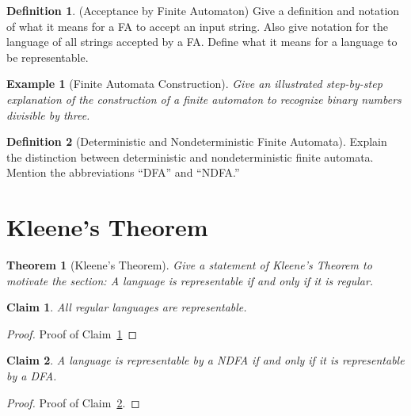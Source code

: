 \documentclass[12 pt, twoside, letterpaper]{article}
\newcommand{\refprop}[1]{Claim~\ref{#1}}
\theoremstyle{definition}
\newtheorem{definition}{Definition}
\theoremstyle{remark}
\theoremstyle{plain}
\newtheorem*{example}{Example}
\newtheorem{theorem}{Theorem}
\newtheorem{claim}{Claim}
\begin{document}
	\begin{definition}(Acceptance by Finite Automaton)
		Give a definition and notation of what it means for a FA to accept an input string.
		Also give notation for the language of all strings accepted by a FA.
		Define what it means for a language to be representable.
	\end{definition}

	\begin{example}[Finite Automata Construction]
		Give an illustrated step-by-step explanation of the construction of a finite automaton to recognize binary numbers divisible by three.
	\end{example}

	\begin{definition}[Deterministic and Nondeterministic Finite Automata]
		Explain the distinction between deterministic and nondeterministic finite automata.
		Mention the abbreviations ``DFA'' and ``NDFA.''
	\end{definition}


\section{Kleene's Theorem} %
\label{sec:kleenes_theorem}

	\begin{theorem}[Kleene's Theorem]
		Give a statement of Kleene's Theorem to motivate the section:
		A language is representable if and only if it is regular.
	\end{theorem}

	\begin{claim}
	\label{prop:regular_languages_representable}
		All regular languages are representable.
	\end{claim}

	\begin{proof}
		Proof of \refprop{prop:regular_languages_representable}
	\end{proof}

	\begin{claim}
	\label{prop:ndfa_dfa_equivalent}
		A language is representable by a NDFA if and only if it is representable by a DFA.
	\end{claim}

	\begin{proof}
	\label{proof:ndfa_dfa_equivalent}
		Proof of \refprop{prop:ndfa_dfa_equivalent}.
	\end{proof}
\end{document}
